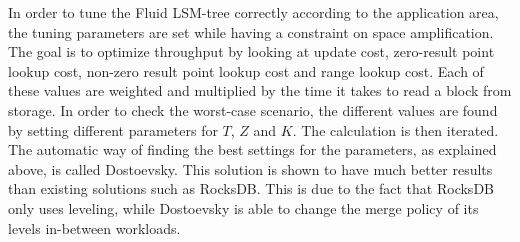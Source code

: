 In order to tune the Fluid LSM-tree correctly according to the application area, the tuning parameters are set while having a constraint on space amplification. The goal is to optimize throughput by looking at update cost, zero-result point lookup cost, non-zero result point lookup cost and range lookup cost. Each of these values are weighted and multiplied by the time it takes to read a block from storage. In order to check the worst-case scenario, the different values are found by setting different parameters for $T$, $Z$ and $K$. The calculation is then iterated. The automatic way of finding the best settings for the parameters, as explained above, is called Dostoevsky. This solution is shown to have much better results than existing solutions such as RocksDB\cite{Dostoevsky}. This is due to the fact that RocksDB only uses leveling, while Dostoevsky is able to change the merge policy of its levels in-between workloads.